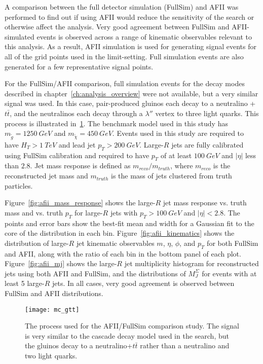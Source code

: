 A comparison between the full detector simulation (FullSim) and AFII was performed to find out if using AFII would reduce the sensitivity of the search or otherwise affect the analysis.
Very good agreement between FullSim and AFII-simulated events is observed across a range of kinematic observables relevant to this analysis.
As a result, AFII simulation is used for generating signal events for all of the grid points used in the limit-setting.
Full simulation events are also generated for a few representative signal points.

For the FullSim/AFII comparison, full simulation events for the decay modes described in chapter~\ref{ch:analysis_overview} were not available, but a very similar signal was used.
In this case, pair-produced gluinos each decay to a neutralino + $t\bar{t}$, and the neutralinos each decay through a $\lambda''$ vertex to three light quarks.
This process is illustrated in~\ref{fig:mc_gtt}.
The benchmark model used in this study has $m_{\tilde{g}}=1250~GeV$ and $m_{\tilde{\chi}}=450~GeV$.
Events used in this study are required to have $H_{T}>1~TeV$ and lead jet $p_{T}>200~GeV$.
Large-$R$ jets are fully calibrated using FullSim calibration and required to have $p_{T}$ of at least $100~GeV$ and $|\eta|$ less than $2.8$.
Jet mass response is defined as $m_{reco}/m_{truth}$, where $m_{reco}$ is the reconstructed jet mass and $m_{truth}$ is the mass of jets clustered from truth particles.

Figure~\ref{fig:afii_mass_response} shows the large-$R$ jet mass response vs. truth mass and vs. truth $p_{T}$ for large-$R$ jets with $p_{T}>100~GeV$ and $|\eta|<2.8$.
The points and error bars show the best-fit mean and width for a Gaussian fit to the core of the distribution in each bin.
Figure~\ref{fig:afii_kinematics} shows the distribution of large-$R$ jet kinematic observables $m$, $\eta$, $\phi$, and $p_{T}$ for both FullSim and AFII, along with the ratio of each bin in the bottom panel of each plot.
Figure~\ref{fig:afii_mj} shows the large-$R$ jet multiplicity histogram for reconstructed jets using both AFII and FullSim, and the distributions of $M_{J}^{\Sigma}$ for events with at least 5 large-$R$ jets.
In all cases, very good agreement is observed between FullSim and AFII distributions.

\begin{figure}[!ht]\centering
    \texttt{[image: mc\_gtt]}
    \caption{The process used for the AFII/FullSim comparison study.
    The signal is very similar to the cascade decay model used in the search, but the gluinos decay to a neutralino+$t\bar{t}$ rather than a neutralino and two light quarks.}
    \label{fig:mc_gtt}
\end{figure}

